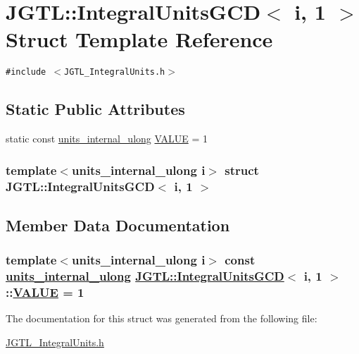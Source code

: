 \hypertarget{struct_j_g_t_l_1_1_integral_units_g_c_d_3_01i_00_011_01_4}{
\section{JGTL::Integral\-Units\-GCD$<$ i, 1 $>$ Struct Template Reference}
\label{struct_j_g_t_l_1_1_integral_units_g_c_d_3_01i_00_011_01_4}
}
{\tt \#include $<$JGTL\_\-Integral\-Units.h$>$}

\subsection*{Static Public Attributes}
\begin{CompactItemize}
\item 
static const \hyperlink{namespace_j_g_t_l_1924d6fd42e2d9661bc0b5a5063b99b3}{units\_\-internal\_\-ulong} \hyperlink{struct_j_g_t_l_1_1_integral_units_g_c_d_3_01i_00_011_01_4_6f1cd0d8c49195f62551cadf2c664899}{VALUE} = 1
\end{CompactItemize}
\subsubsection*{template$<$units\_\-internal\_\-ulong i$>$ struct JGTL::Integral\-Units\-GCD$<$ i, 1 $>$}



\subsection{Member Data Documentation}
\hypertarget{struct_j_g_t_l_1_1_integral_units_g_c_d_3_01i_00_011_01_4_6f1cd0d8c49195f62551cadf2c664899}{
\subsubsection[VALUE]{\setlength{\rightskip}{0pt plus 5cm}template$<$units\_\-internal\_\-ulong i$>$ const \hyperlink{namespace_j_g_t_l_1924d6fd42e2d9661bc0b5a5063b99b3}{units\_\-internal\_\-ulong} \hyperlink{struct_j_g_t_l_1_1_integral_units_g_c_d}{JGTL::Integral\-Units\-GCD}$<$ i, 1 $>$::\hyperlink{struct_j_g_t_l_1_1_integral_units_g_c_d_3_01i_00_011_01_4_6f1cd0d8c49195f62551cadf2c664899}{VALUE} = 1}}
\label{struct_j_g_t_l_1_1_integral_units_g_c_d_3_01i_00_011_01_4_6f1cd0d8c49195f62551cadf2c664899}




The documentation for this struct was generated from the following file:\begin{CompactItemize}
\item 
\hyperlink{_j_g_t_l___integral_units_8h}{JGTL\_\-Integral\-Units.h}\end{CompactItemize}
